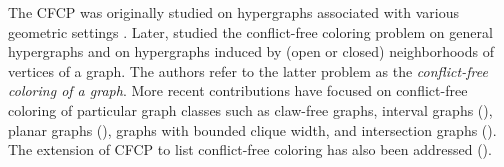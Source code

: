 \documentclass[preprint, 11pt, authoryear]{elsarticle}
\newcommand{\R}{{\mathbb R}}
\newcommand{\quitar}[1]{{\color{red} \sout{#1}}}
\begin{document}
The CFCP was originally studied on hypergraphs associated with various geometric settings \cite{HarPeledSmorodinsky03,ChenEtAl09,PachTardos10}. 
Later, \cite{PachTardos09} studied the conflict-free coloring problem on general hypergraphs and on hypergraphs induced by (open or closed) neighborhoods of vertices of a graph. The authors refer to the latter problem as the \emph{conflict-free coloring of a graph}.
More recent contributions have focused on conflict-free coloring of particular graph classes such as claw-free graphs, interval graphs (\cite{BhyravarapuEtAl22}), planar graphs (\cite{FabriciEtAl23}), graphs with bounded clique width, and intersection graphs (\cite{BhyravarapuEtAl24}). The extension of CFCP to list conflict-free coloring has also been addressed (\cite{Gupta2026}). 



\end{document}
